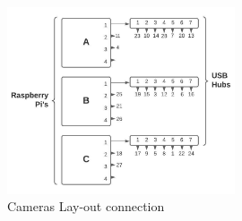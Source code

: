 \documentclass[12pt]{report}
\begin{document}
\begin{figure}[H]%
   \centering
  \includegraphics[width=0.6\textwidth]{cameras_layout.png}
 \caption{Cameras Lay-out connection}
 \label{fig:cameras_layout} 
\end{figure}
\end{document}
